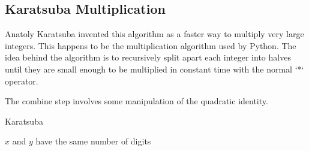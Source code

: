 \documentclass{standalone}
\begin{document}
\subsection{Karatsuba Multiplication}

Anatoly Karatsuba invented this algorithm as a faster way to multiply very large
integers.
This happens to be the multiplication algorithm used by Python. The idea behind
the algorithm is to recursively split apart each integer into halves until they
are small enough to be multiplied in constant time with the normal `*` operator.

The combine step involves some manipulation of the quadratic identity.

\begin{algorithm}
  \caption{Karatsuba}
  \begin{algorithmic}
    \Require $x$ and $y$ have the same number of digits
  \end{algorithmic}
\end{algorithm}
\end{document}
